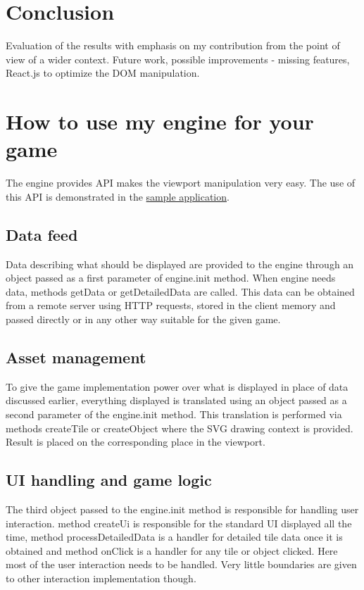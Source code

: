 \documentclass[11pt,oneside, final]{fithesis2}
\begin{document}
\chapter{Conclusion}
Evaluation of the results with emphasis on my contribution from the point of view of a wider context.
Future work, possible improvements - missing features, React.js to optimize the DOM manipulation.


\appendix
\chapter{How to use my engine for your game}
The engine provides API makes the viewport manipulation very easy. The use of this API is demonstrated in the \href{https://github.com/vit-svoboda/svg-engine/tree/master/src/main/webapp/Scripts/game}{sample application}.

\section{Data feed}
Data describing what should be displayed are provided to the engine through an object passed as a first parameter of engine.init method. When engine needs data, methods getData or getDetailedData are called. This data can be obtained from a remote server using HTTP requests, stored in the client memory and passed directly or in any other way suitable for the given game.

\section{Asset management}
To give the game implementation power over what is displayed in place of data discussed earlier, everything displayed is translated using an object passed as a second parameter of the engine.init method. This translation is performed via methods createTile or createObject where the SVG drawing context is provided. Result is placed on the corresponding place in the viewport.

\section{UI handling and game logic}
The third object passed to the engine.init method is responsible for handling user interaction. method createUi is responsible for the standard UI displayed all the time, method processDetailedData is a handler for detailed tile data once it is obtained and method onClick is a handler for any tile or object clicked. Here most of the user interaction needs to be handled. Very little boundaries are given to other interaction implementation though.
\end{document}
